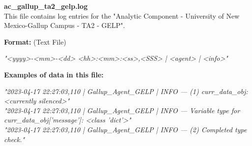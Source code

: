 \begin{description}
\begin{addmargin}[0em]{0em}
    \label{ac_gallup_ta2_gelp.log}
    \begin{addmargin}[1em]{0em} %
        \textbf{ac\_gallup\_ta2\_gelp.log}\\
        This file contains log entries for the "Analytic Component - University of New Mexico-Gallup Campus - TA2 - GELP".
        \begin{addmargin}[1em]{0em}
            \textbf{Format:} (Text File)
            \begin{addmargin}[1em]{0em}
                \textit{"<yyyy>-<mm>-<dd> <hh>:<mm>:<ss>,<SSS> | <agent> | <info>"}
            \end{addmargin}
        \end{addmargin}
        \begin{addmargin}[1em]{0em}
            \textbf{Examples of data in this file:}
            \begin{addmargin}[1em]{0em}\textit{"2023-04-17 22:27:03,110 | Gallup\_Agent\_GELP | INFO — (1) curr\_data\_obj: <currently silenced>"\\
                "2023-04-17 22:27:03,110 | Gallup\_Agent\_GELP | INFO — Variable type for curr\_data\_obj['message']: <class 'dict'>"\\
                "2023-04-17 22:27:03,110 | Gallup\_Agent\_GELP | INFO — (2) Completed type check."}
            \end{addmargin}
        \end{addmargin}
    \end{addmargin} %
    \textbf{\\}


\end{addmargin}
\end{description}
